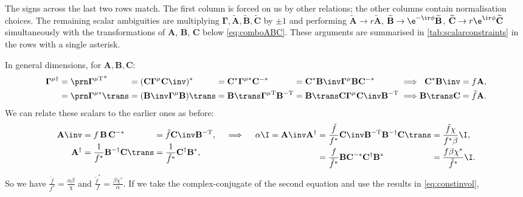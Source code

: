 \documentclass[11pt]{article}
\newcommand{\invd}{^{-\dag}}
\newcommand{\invt}{^{-\mathrm{T}}}
\newcommand{\invc}{^{-\ast}}
\newcommand{\cc}{^\ast}
\newcommand{\hc}{^\dag}
\newcommand{\Gammab}{\boldsymbol{\Gamma}}
\newcommand{\mud}{{\mu\dag}}
\newcommand{\mut}{{\mu\mathrm{T}}}
\newcommand{\muc}{{\mu\ast}}
\newcommand{\A}{\mathbf{A}}
\newcommand{\B}{\mathbf{B}}
\renewcommand{\C}{\mathbf{C}}
\newcommand{\At}{\widetilde{\A}}
\newcommand{\Bt}{\widetilde{\B}}
\newcommand{\Ct}{\widetilde{\C}}
\begin{document}
%
The signs across the last two rows match.
The first column is forced on us by other relations; the other columns contain normalisation choices.
The remaining scalar ambiguities are multiplying \(\Gammab,\At,\Bt,\Ct\) by \(\pm1\)
and performing \( \At \rightarrow r \At \), \( \Bt \rightarrow \e^{-\ir\phi} \Bt \),
\( \Ct \rightarrow r\e^{\ir\phi} \Ct \) simultaneously with the transformations of \(\A\), \(\B\), \(\C\) below \cref{eq:comboABC}.
These arguments are summarised in \cref{tab:scalarconstraints} in the rows with a single asterisk.

In general dimensions, for \(\A,\B,\C\):
%
\begin{equation*}
\begin{alignedat}{6}
  \Gammab^\mud &= \Gammap[\mut]\cc &
    &= (\C \Gammab^\mu \C\inv)\cc &
    &= \C\cc \Gammab^\muc \C\invc &
    &= \C\cc \B\inv \Gammab^\mu \B \C\invc &
    &\implies &
  \C\cc \B\inv &= f \A, \\
    &= \Gammap[\muc]\trans &
    &= (\B\inv \Gammab^\mu \B)\trans &
    &= \B\trans \Gammab^\mut \B\invt &
    &= \B\trans \C \Gammab^\mu \C\inv \B\invt &
    &\implies &
  \B\trans \C &= \tilde{f} \A. \\
\end{alignedat}
\end{equation*}
%
We can relate these scalars to the earlier ones as before:
%
\begin{equation*}
\begin{alignedat}[t]{2}
  \A\inv &= f \, \B \, \C\invc &
    &= \tilde{f} \C\inv \B\invt, \\
  \A\hc &= \frac{1}{f\cc} \B\invd \C\trans &
    &= \frac{1}{\tilde{f}\cc} \C\hc \B\cc,
\end{alignedat}
   \quad\implies\quad
\begin{alignedat}[t]{3}
  \alpha \I &= \A\inv \A\hc &
    &= \frac{\tilde{f}}{f\cc} \C\inv \B\invt \B\invd \C\trans &
      &= \frac{\tilde{f} \chi}{f\cc \beta} \I, \\ &&
    &= \frac{f}{\tilde{f}\cc} \B \C\invc \C\hc \B\cc &
      &= \frac{f \beta \chi\cc}{\tilde{f}\cc} \I.
\end{alignedat}
\end{equation*}
%
So we have \( \frac{\tilde{f}}{f\cc} = \frac{\alpha \beta}{\chi} \)
and \( \frac{\tilde{f}\cc}{f} = \frac{\beta \chi\cc}{\alpha} \).
If we take the complex-conjugate of the second equation and use the results in \cref{eq:constinvol},
\end{document}
